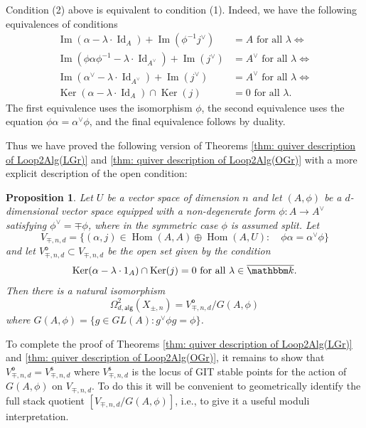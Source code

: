 \documentclass{amsart}
\newtheorem{proposition}[theorem]{Proposition}
\theoremstyle{definition}
\newcommand{\kk} {{\mathbbm k}}
\newcommand{\Hom}{\operatorname{Hom}}
\newcommand{\Ker}{\operatorname{Ker}}
\newcommand{\im}{\operatorname{Im}}
\newcommand{\alg}{\mathsf{alg}}
\newcommand{\open}{\mathsf{o}}
\newcommand{\stable}{\mathsf{s}}
\newcommand{\LoopTwo}{\Omega^{2}_{d,\alg}}
\newcommand{\Id}{\operatorname{Id}}
\newcommand{\Xpm}{X_{\pm,n}}
\begin{document}
\bigskip

Condition (2) above is equivalent to condition (1). Indeed, we have
the following equivalences of conditions
\begin{align*}
\im (\alpha -\lambda \cdot \Id_{A})+  \im (\phi^{-1}j^{\vee} )&=A
\text{ for all } \lambda \iff \\
\im (\phi \alpha\phi^{-1} -\lambda \cdot \Id_{A^{\vee }})+  \im
(j^{\vee} )&=A^{\vee }
\text{ for all } \lambda \iff \\
\im (\alpha^{\vee } -\lambda \cdot \Id_{A^{\vee }})+ \im
(j^{\vee} )&=A^{\vee }
\text{ for all } \lambda \iff \\
\Ker (\alpha -\lambda \cdot \Id_{A})\cap \Ker (j) &= 0 \text{ for all } \lambda .
\end{align*}
The first equivalence uses the isomorphism $\phi$, the second
equivalence uses the equation $\phi \alpha  = \alpha^{\vee}\phi$, and
the final equivalence follows by duality.

Thus we have proved the following version of Theorems \ref{thm: quiver
description of Loop2Alg(LGr)} and \ref{thm: quiver description of
Loop2Alg(OGr)} with a more explicit description of the open condition:
\begin{proposition}\label{prop: quiver description of Loop2Alg(Xpm)
with explicit open condition}
Let $U$ be a vector space of dimension $n$ and let $(A,\phi )$ be a
$d$-dimensional vector space equipped with a non-degenerate form $\phi
:A\to A^{\vee}$ satisfying $\phi^{\vee}=\mp \phi$, where in the
symmetric case $\phi$ is assumed split. Let
\[
V_{\mp ,n,d} = \{(\alpha ,j)\in \Hom (A,A)\oplus \Hom (A,U):\quad \phi
\alpha =\alpha^{\vee}\phi \}
\]
and let $V^{\open}_{\mp ,n,d}\subset V_{\mp ,n,d}$ be the open set given
by the condition
\[
\Ker (\alpha -\lambda \cdot 1_{A})\cap \Ker (j) = 0\text{ for all } \lambda \in \overline{\kk}.
\]
Then there is a natural isomorphism
\[
\LoopTwo (\Xpm ) = V^{\open}_{\mp ,n,d}/G(A,\phi )
\]
where $G(A,\phi ) = \{g\in GL(A): g^{\vee}\phi g = \phi \}$. 
\end{proposition}

To complete the proof of Theorems \ref{thm: quiver description of
Loop2Alg(LGr)} and \ref{thm: quiver description of Loop2Alg(OGr)}, it
remains to show that $V^{\open}_{\mp ,n,d} = V^{\stable }_{\mp ,n,d}$
where $V^{\stable }_{\mp ,n,d}$ is the locus of GIT stable points for
the action of $G(A,\phi )$ on $V_{\mp ,n,d}$. To do this it will be
convenient to geometrically identify the full stack quotient $[V_{\mp
,n,d} / G(A,\phi )]$, i.e., to give it a useful moduli interpretation.
\end{document}
